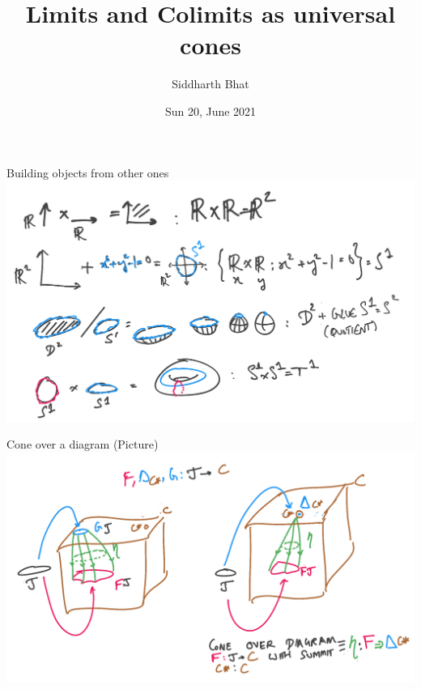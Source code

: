 \documentclass[8pt]{beamer}
\author{Siddharth Bhat}
\date{Sun 20, June 2021}
\institute{\texttt{\#\#harmless} Category Theory in Context}
\title{Limits and Colimits as universal cones}
\begin{document}
\maketitle

\begin{frame}[fragile]{Building objects from other ones}
    \includegraphics[width=\textwidth]{./examples-of-limits.png}
\end{frame}

\begin{frame}[fragile]{Cone over a diagram (Picture)}
    \includegraphics[width=\textwidth]{./cone.png}
\end{frame}
\end{document}
